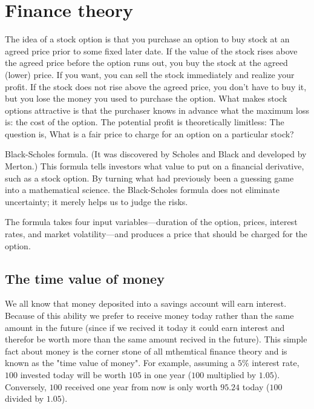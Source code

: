 \chapter{Finance theory}

The idea of a stock option is that you purchase an option to buy stock at an agreed price prior to some fixed later date. If the value of the stock rises above the agreed price before the option runs out, you buy the stock at the agreed (lower) price. If you want, you can sell the stock immediately and realize your profit. If the stock does not rise above the agreed price, you don’t have to buy it, but you lose the money you used to purchase the option. What makes stock options attractive is that the purchaser knows in advance what the maximum loss is: the cost of the option. The potential profit is theoretically limitless: The question is, What is a fair price to charge for an option on a particular stock?

Black-Scholes formula. (It was discovered by Scholes and Black and developed by Merton.) This formula tells investors what value to put on a financial derivative, such as a stock option. By turning what had previously been a guessing game into a mathematical science. the Black-Scholes formula does not eliminate uncertainty; it merely helps us to judge the risks.

The formula takes four input variables—duration of the option, prices, interest rates, and market volatility—and produces a price that should be charged for the option. 


\section{The time value of money}
We all know that money deposited into a savings account will earn interest.
Because of this ability we prefer to receive money today rather than the same
amount in the future (since if we recived it today it could earn interest and therefor be worth more than the same amount recived in the future). This simple
fact about money is the corner stone of all mthemtical finance theory and is
known as the "time value of money". For example, assuming a $5\%$ interest rate,
$100$ invested today will be worth $105$ in one year ($100$ multiplied by $1.05$).
Conversely, $100$ received one year from now is only worth $95.24$ today ($100$
divided by $1.05$).

